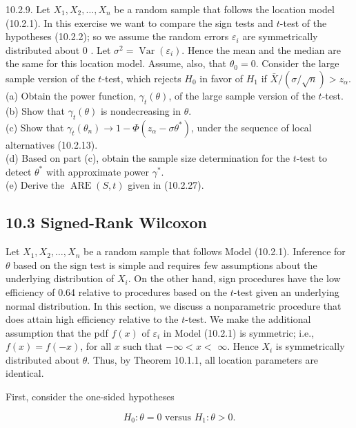 10.2.9. Let $X_{1}, X_{2}, \ldots, X_{n}$ be a random sample that follows the location model (10.2.1). In this exercise we want to compare the sign tests and $t$-test of the hypotheses (10.2.2); so we assume the random errors $\varepsilon_{i}$ are symmetrically distributed about 0 . Let $\sigma^{2}=\operatorname{Var}\left(\varepsilon_{i}\right)$. Hence the mean and the median are the same for this location model. Assume, also, that $\theta_{0}=0$. Consider the large sample version of the $t$-test, which rejects $H_{0}$ in favor of $H_{1}$ if $\bar{X} /(\sigma / \sqrt{n})>z_{\alpha}$.\\
(a) Obtain the power function, $\gamma_{t}(\theta)$, of the large sample version of the $t$-test.\\
(b) Show that $\gamma_{t}(\theta)$ is nondecreasing in $\theta$.\\
(c) Show that $\gamma_{t}\left(\theta_{n}\right) \rightarrow 1-\Phi\left(z_{\alpha}-\sigma \theta^{*}\right)$, under the sequence of local alternatives (10.2.13).\\
(d) Based on part (c), obtain the sample size determination for the $t$-test to detect $\theta^{*}$ with approximate power $\gamma^{*}$.\\
(e) Derive the $\operatorname{ARE}(S, t)$ given in (10.2.27).

\subsection*{10.3 Signed-Rank Wilcoxon}
Let $X_{1}, X_{2}, \ldots, X_{n}$ be a random sample that follows Model (10.2.1). Inference for $\theta$ based on the sign test is simple and requires few assumptions about the underlying distribution of $X_{i}$. On the other hand, sign procedures have the low efficiency of 0.64 relative to procedures based on the $t$-test given an underlying normal distribution. In this section, we discuss a nonparametric procedure that does attain high efficiency relative to the $t$-test. We make the additional assumption that the pdf $f(x)$ of $\varepsilon_{i}$ in Model (10.2.1) is symmetric; i.e., $f(x)=f(-x)$, for all $x$ such that $-\infty<x<$ $\infty$. Hence $X_{i}$ is symmetrically distributed about $\theta$. Thus, by Theorem 10.1.1, all location parameters are identical.

First, consider the one-sided hypotheses


\begin{equation*}
H_{0}: \theta=0 \text { versus } H_{1}: \theta>0 . \tag{10.3.1}
\end{equation*}


